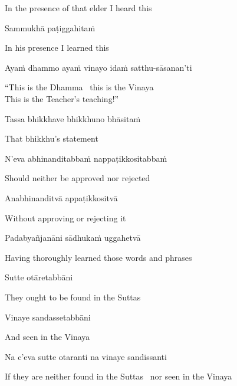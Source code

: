 \begin{english}
  In the presence of that elder I heard this
\end{english}

Sammukhā paṭiggahitaṁ

\begin{english}
  In his presence I learned this
\end{english}

Ayaṁ dhammo ayaṁ vinayo idaṁ satthu-sāsanan'ti

\begin{english}
  ``This is the Dhamma \breathmark\ this is the Vinaya\\
  This is the Teacher's teaching!''
\end{english}

Tassa bhikkhave bhikkhuno bhāsitaṁ

\begin{english}
  That bhikkhu's statement
\end{english}

N'eva abhinanditabbaṁ nappaṭikkositabbaṁ

\begin{english}
  Should neither be approved nor rejected
\end{english}

Anabhinanditvā appaṭikkositvā

\begin{english}
  Without approving or rejecting it
\end{english}

Padabyañjanāni sādhukaṁ uggahetvā

\begin{english}
  Having thoroughly learned those words and phrases
\end{english}

Sutte otāretabbāni

\begin{english}
  They ought to be found in the Suttas
\end{english}

Vinaye sandassetabbāni

\begin{english}
  And seen in the Vinaya
\end{english}

Na c'eva sutte otaranti na vinaye sandissanti

\begin{english-hang}
  If they are neither found in the Suttas \breathmark\ nor seen in the Vinaya
\end{english-hang}

